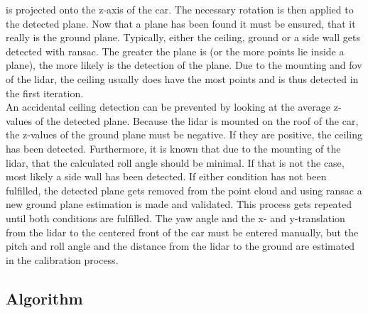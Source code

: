 is projected onto the z-axis of the car.
The necessary rotation is then applied to the detected plane.
Now that a plane has been found it must be ensured, that it really is the ground plane.
Typically, either the ceiling, ground or a side wall gets detected with \gls{ransac}.
The greater the plane is (or the more points lie inside a plane), the more likely is the detection of the plane.
Due to the mounting and \gls{fov} of the \gls{lidar}, the ceiling usually does have the most points and is thus detected in the first iteration.\\
An accidental ceiling detection can be prevented by looking at the average z-values of the detected plane.
Because the \gls{lidar} is mounted on the roof of the car, the z-values of the ground plane must be negative.
If they are positive, the ceiling has been detected.
Furthermore, it is known that due to the mounting of the \gls{lidar}, that the calculated roll angle should be minimal.
If that is not the case, most likely a side wall has been detected.
If either condition has not been fulfilled, the detected plane gets removed from the point cloud and using \gls{ransac} a new ground plane estimation is made and validated.
This process gets repeated until both conditions are fulfilled.
The yaw angle and the x- and y-translation from the \gls{lidar} to the centered front of the car
must be entered manually, but the pitch and roll angle and the distance from the \gls{lidar} to the ground are estimated in the calibration process.


\subsection{Algorithm}
\label{ssec:algorithm_lidar}
